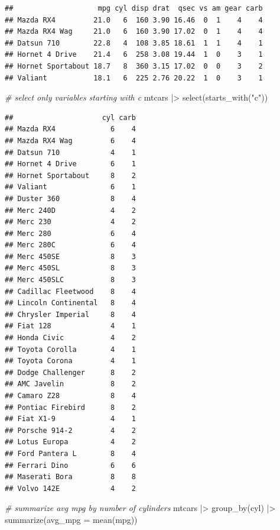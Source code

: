 \documentclass[
  12pt,
  oneside]{book}
\newenvironment{Shaded}{\begin{snugshade}}{\end{snugshade}}
\newcommand{\AttributeTok}[1]{\textcolor[rgb]{0.77,0.63,0.00}{#1}}
\newcommand{\CommentTok}[1]{\textcolor[rgb]{0.56,0.35,0.01}{\textit{#1}}}
\newcommand{\FunctionTok}[1]{\textcolor[rgb]{0.00,0.00,0.00}{#1}}
\newcommand{\NormalTok}[1]{#1}
\newcommand{\SpecialCharTok}[1]{\textcolor[rgb]{0.00,0.00,0.00}{#1}}
\newcommand{\StringTok}[1]{\textcolor[rgb]{0.31,0.60,0.02}{#1}}
\theoremstyle{definition}
\theoremstyle{definition}
\theoremstyle{definition}
\theoremstyle{definition}
\theoremstyle{remark}
\begin{document}
\begin{verbatim}
##                    mpg cyl disp drat  qsec vs am gear carb
## Mazda RX4         21.0   6  160 3.90 16.46  0  1    4    4
## Mazda RX4 Wag     21.0   6  160 3.90 17.02  0  1    4    4
## Datsun 710        22.8   4  108 3.85 18.61  1  1    4    1
## Hornet 4 Drive    21.4   6  258 3.08 19.44  1  0    3    1
## Hornet Sportabout 18.7   8  360 3.15 17.02  0  0    3    2
## Valiant           18.1   6  225 2.76 20.22  1  0    3    1
\end{verbatim}

\begin{Shaded}
\begin{Highlighting}[]
\CommentTok{\# select only variables starting with \textasciigrave{}c\textasciigrave{}}
\NormalTok{mtcars }\SpecialCharTok{|\textgreater{}} 
  \FunctionTok{select}\NormalTok{(}\FunctionTok{starts\_with}\NormalTok{(}\StringTok{"c"}\NormalTok{))}
\end{Highlighting}
\end{Shaded}

\begin{verbatim}
##                     cyl carb
## Mazda RX4             6    4
## Mazda RX4 Wag         6    4
## Datsun 710            4    1
## Hornet 4 Drive        6    1
## Hornet Sportabout     8    2
## Valiant               6    1
## Duster 360            8    4
## Merc 240D             4    2
## Merc 230              4    2
## Merc 280              6    4
## Merc 280C             6    4
## Merc 450SE            8    3
## Merc 450SL            8    3
## Merc 450SLC           8    3
## Cadillac Fleetwood    8    4
## Lincoln Continental   8    4
## Chrysler Imperial     8    4
## Fiat 128              4    1
## Honda Civic           4    2
## Toyota Corolla        4    1
## Toyota Corona         4    1
## Dodge Challenger      8    2
## AMC Javelin           8    2
## Camaro Z28            8    4
## Pontiac Firebird      8    2
## Fiat X1-9             4    1
## Porsche 914-2         4    2
## Lotus Europa          4    2
## Ford Pantera L        8    4
## Ferrari Dino          6    6
## Maserati Bora         8    8
## Volvo 142E            4    2
\end{verbatim}

\begin{Shaded}
\begin{Highlighting}[]
\CommentTok{\# summarize avg mpg by number of cylinders}
\NormalTok{mtcars }\SpecialCharTok{|\textgreater{}} 
  \FunctionTok{group\_by}\NormalTok{(cyl) }\SpecialCharTok{|\textgreater{}} 
  \FunctionTok{summarize}\NormalTok{(}\AttributeTok{avg\_mpg =} \FunctionTok{mean}\NormalTok{(mpg))}
\end{Highlighting}
\end{Shaded}
\end{document}
